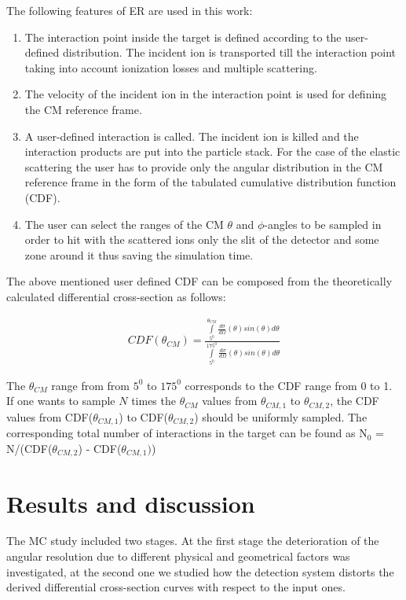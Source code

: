 \documentclass[%
 aip,
cp,  %
 amsmath,amssymb,%
 reprint,%
]{revtex4-2}
\begin{document}
The following features of ER are used in this work:
\begin{enumerate}
\item The interaction point inside the target is defined according to the user-defined distribution. The incident ion is transported till the interaction point taking into account ionization losses and multiple scattering.
\item The velocity of the incident ion in the interaction point is used for defining the CM reference frame.
\item A user-defined interaction is called. The incident ion is killed and the interaction products are put into the particle stack. For the case of the elastic scattering the user has to provide only the angular distribution in the CM reference frame in the form of the tabulated cumulative distribution function (CDF).
\item The user can select the ranges of the CM $\theta$ and $\phi$-angles to be sampled in order to hit with the scattered ions only the slit of the detector and some zone around it thus saving the simulation time.
\end{enumerate}

The above mentioned user defined CDF can be composed from the theoretically calculated differential cross-section as follows:

\begin{eqnarray}
 CDF(\theta_{CM}) = \frac{ \int\limits_{5^0}^{\theta_{CM}} \frac{d\sigma}{d\Omega}(\theta) sin(\theta)d\theta } { \int\limits_{5^0}^{175^0} \frac{d\sigma}{d\Omega}(\theta) sin(\theta)d\theta }
\end{eqnarray}

The $\theta_{CM}$ range from from $5 ^0$ to $175 ^0$ corresponds to the CDF range from 0 to 1.  If one wants to sample $N$ times the $\theta_{CM}$ values from $\theta_{CM, 1}$ to $\theta_{CM, 2}$, the CDF values from CDF($\theta_{CM, 1}$) to CDF($\theta_{CM, 2}$) should be uniformly sampled.  The corresponding total  number of interactions in the target can be found as N$_0$ = N/(CDF($\theta_{CM, 2}$) - CDF($\theta_{CM, 1})$)


\section{Results and discussion}

The MC study included two stages. At the first stage the deterioration of the angular resolution due to different physical and geometrical factors  was investigated, at the second one we studied how the detection system distorts the derived differential cross-section curves with respect to the input ones.
\end{document}

